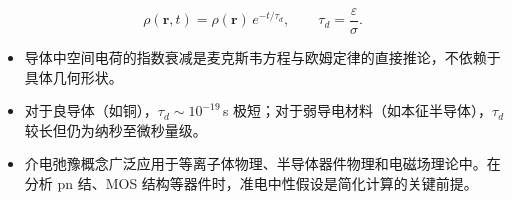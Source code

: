 \begin{formulabox}[答案汇总]
\begin{equation}
\boxed{\rho(\bm{r},t)=\rho(\bm{r})\,e^{-t/\tau_d},\qquad\tau_d=\frac{\varepsilon}{\sigma}.}
\end{equation}
\end{formulabox}

\begin{insightbox}[物理图像]
\begin{itemize}
    \item 导体中空间电荷的指数衰减是麦克斯韦方程与欧姆定律的直接推论，不依赖于具体几何形状。
    \item 对于良导体（如铜），$\tau_d\sim10^{-19}\,$s 极短；对于弱导电材料（如本征半导体），$\tau_d$ 较长但仍为纳秒至微秒量级。
    \item 介电弛豫概念广泛应用于等离子体物理、半导体器件物理和电磁场理论中。在分析 pn 结、MOS 结构等器件时，准电中性假设是简化计算的关键前提。
\end{itemize}
\end{insightbox}
